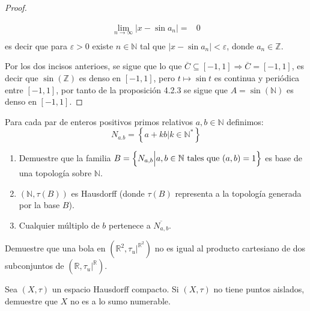 \documentclass[12pt]{report}
\theoremstyle{largebreak}
\newcommand\abs[1]{\ensuremath{\big|#1\big|}}
\newcommand{\Cls}[1]{\ensuremath{\overline{#1}}}
\begin{document}
\begin{proof}
\begin{itemize}
\begin{equation*}
                \begin{split}
                    \lim_{n\rightarrow\infty }\abs{x-\sin a_n}=&0\\
                \end{split}
            \end{equation*}
            es decir que para $\varepsilon>0$ existe $n\in\mathbb{N}$ tal que $\abs{x-\sin a_n}<\varepsilon$, donde $a_n\in\mathbb{Z}$. 
        \end{itemize}
        Por los dos incisos anterioes, se sigue que lo que $\Cls{C}\subseteq[-1,1]\Rightarrow \Cls{C}=[-1,1]$, es decir que $\sin(\mathbb{Z})$ es denso en $[-1,1]$, pero $t\mapsto\sin t$ es continua y periódica entre $[-1,1]$, por tanto de la proposición 4.2.3 se sigue que $A=\sin(\mathbb{N})$ es denso en $[-1,1]$.
    \end{proof}

    \begin{excer}
        Para cada par de enteros positivos primos relativos $a,b\in\mathbb{N}$ definimos:
        \begin{equation*}
            N_{a.b}=\left\{a+kb\Big|k\in\mathbb{N}^* \right\}
        \end{equation*}
        \begin{enumerate}
            \item Demuestre que la familia $B=\left\{N_{ a,b}\Big|a,b\in\mathbb{N}\textup{ tales que }(a,b)=1 \right\}$ es base de una topología sobre $\mathbb{N}$.
            \item $(\mathbb{N},\tau(B))$ es Hausdorff (donde $\tau(B)$ representa a la topología generada por la base $B$).
            \item Cualquier múltiplo de $b$ pertenece a $\Cls{N_{ a,b}}$.
        \end{enumerate}
    \end{excer}

    \begin{excer}
        Demuestre que una bola en $(\mathbb{R}^2,\tau_u|^{\mathbb{R}^2})$ no es igual al producto cartesiano de dos subconjuntos de $(\mathbb{R},\tau_u|^{\mathbb{R}})$.
    \end{excer}

    \begin{excer}
        Sea $(X,\tau)$ un espacio Hausdorff compacto. Si $(X,\tau)$ no tiene puntos aislados, demuestre que $X$ no es a lo sumo numerable.
    \end{excer}
\end{document}
